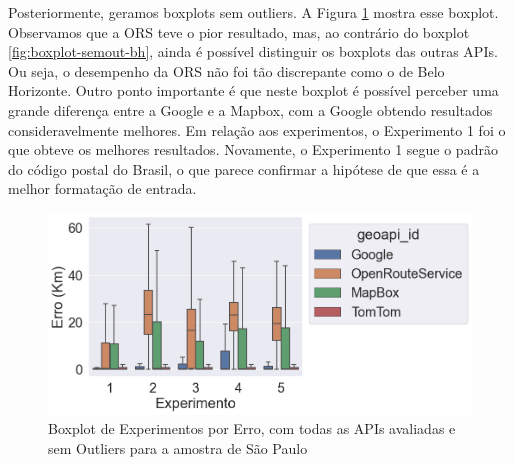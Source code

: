 Posteriormente, geramos boxplots sem outliers. A Figura \ref{fig:boxplot-semout-sp} mostra esse boxplot. Observamos que a ORS teve o pior resultado, mas, ao contrário do boxplot \ref{fig:boxplot-semout-bh}, ainda é possível distinguir os boxplots das outras APIs. Ou seja, o desempenho da ORS não foi tão discrepante como o de Belo Horizonte. Outro ponto importante é que neste boxplot é possível perceber uma grande diferença entre a Google e a Mapbox, com a Google obtendo resultados consideravelmente melhores. Em relação aos experimentos, o Experimento 1 foi o que obteve os melhores resultados. Novamente, o Experimento 1 segue o padrão do código postal do Brasil, o que parece confirmar a hipótese de que essa é a melhor formatação de entrada.

\begin{figure}[h]
    \centering
    \includegraphics[width=\textwidth]{Figuras/boxplotExperimentoSemOutSP.png}
    \caption{Boxplot de Experimentos por Erro, com todas as APIs avaliadas e sem Outliers para a amostra de São Paulo}
    \label{fig:boxplot-semout-sp}
\end{figure}



